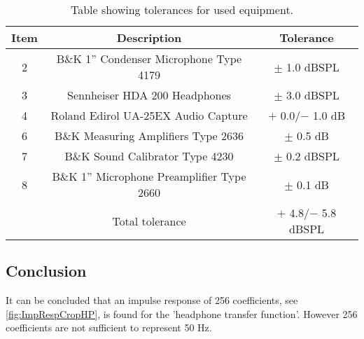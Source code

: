 \begin{table}[H]
	\centering
	\begin{tabular}{ c c c } \toprule
	{Item}	& 		{Description} 							& {Tolerance}\\ \bottomrule 
		2	&	B\&K 1'' Condenser Microphone Type 4179 	& $\pm$ 1.0 dBSPL 	\cite{BK4179_2660Tol}		\\
		3	&	Sennheiser HDA 200 Headphones				& $\pm$ 3.0 dBSPL	\cite{HDA200Tol}	\\
		4	&	Roland Edirol UA-25EX Audio Capture			& $+$ 0.0/$-$ 1.0 dB	\cite{UA25EXTol}	\\
		6	&	B\&K Measuring Amplifiers Type 2636			& $\pm$ 0.5 dB	\cite{BK2636Tol}	\\
		7	&	B\&K Sound Calibrator Type 4230				& $\pm$ 0.2 dBSPL	\cite{BK4231Tol}	\\ 
		8	&	B\&K 1'' Microphone Preamplifier Type 2660	& $\pm$ 0.1 dB	\cite{UA25EXTol}	\\ \bottomrule
			&	Total tolerance								& $+$ 4.8/$-$ 5.8	dBSPL	\\ \bottomrule	
	\end{tabular}
	\caption{Table showing tolerances for used equipment.}
	\label{TolerancesHP}
\end{table}

\subsection{Conclusion}
It can be concluded that an impulse response of 256 coefficients, see \autoref{fig:ImpRespCropHP}, is found for the 'headphone transfer function'. However 256 coefficients are not sufficient to represent 50 Hz.    
